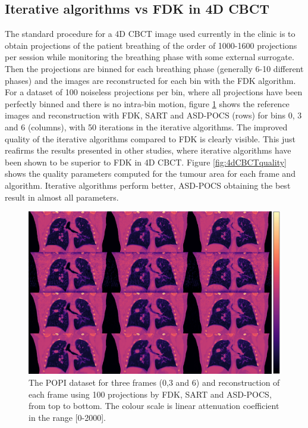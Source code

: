 \subsection{Iterative algorithms vs FDK in 4D CBCT}
The standard procedure for a 4D CBCT image used currently in the clinic is to obtain projections of the patient breathing of the order of 1000-1600\cite{thengumpallil2016difference} projections per session while monitoring the breathing phase with some external surrogate. Then the projections are binned for each breathing phase (generally 6-10 different phases) and the images are reconstructed for each bin with the FDK algorithm. For a dataset of 100 noiseless projections per bin, where all projections have been perfectly binned and there is no intra-bin motion, figure \ref{fig:4dCBCT3static} shows the reference images and reconstruction with FDK, SART and ASD-POCS (rows) for bins 0, 3 and 6 (columns), with 50 iterations in the iterative algorithms. The improved quality of the iterative algorithms compared to FDK is clearly visible. This just reafirms the results presented in other studies\cite{schmidt2014clinical}\cite{shieh2014image}, where iterative algorithms have been shown to be superior to FDK in 4D CBCT. Figure \ref{fig:4dCBCTquality} shows the quality parameters computed for the tumour area for each frame and algorithm. Iterative algorithms perform better, ASD-POCS obtaining the best result in almost all parameters.
 
\begin{figure}
\begin{center}

\includegraphics[width=\textwidth]{accuracyMC/4DCBCT3stage.png} 


\end{center}

\caption[Three frames of the 4D CBCT recosntruction with different algorithm]{\label{fig:4dCBCT3static} The POPI dataset for three frames (0,3 and 6) and reconstruction of each frame using 100 projections by FDK, SART and ASD-POCS, from top to bottom.  The colour scale is linear attenuation coefficient in the range [0-2000].} 
\end{figure}

